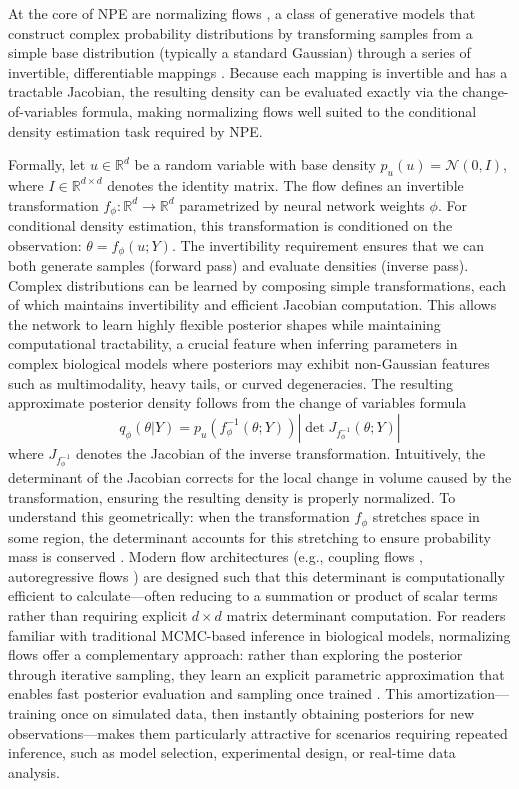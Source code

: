 \documentclass{article}
\begin{document}
At the core of NPE are normalizing flows \cite{rezende2015variational, papamakarios2021normalizing}, a class of generative models that construct complex probability distributions by transforming samples from a simple base distribution (typically a standard Gaussian) through a series of invertible, differentiable mappings \cite{kobyzev2020normalizing}. Because each mapping is invertible and has a tractable Jacobian, the resulting density can be evaluated exactly via the change-of-variables formula, making normalizing flows well suited to the conditional density estimation task required by NPE.


Formally, let $u \in \mathbb{R}^d$ be a random variable with base density $p_u(u) = \mathcal{N}(0, I)$, where $I \in \mathbb{R}^{d \times d}$ denotes the identity matrix. The flow defines an invertible transformation $f_\phi: \mathbb{R}^d \rightarrow \mathbb{R}^d$ parametrized by neural network weights $\phi$. For conditional density estimation, this transformation is conditioned on the observation: $\theta = f_\phi(u; Y)$. The invertibility requirement ensures that we can both generate samples (forward pass) and evaluate densities (inverse pass). Complex distributions can be learned by composing simple transformations, each of which maintains invertibility and efficient Jacobian computation. This allows the network to learn highly flexible posterior shapes while maintaining computational tractability, a crucial feature when inferring parameters in complex biological models where posteriors may exhibit non-Gaussian features such as multimodality, heavy tails, or curved degeneracies. The resulting approximate posterior density follows from the change of variables formula
\begin{equation}
	q_\phi(\theta | Y) = p_u(f_\phi^{-1}(\theta;Y)) \left| \det J_{f_\phi^{-1}}(\theta; Y) \right|
\end{equation}
where $J_{f_\phi^{-1}}$ denotes the Jacobian of the inverse transformation. Intuitively, the determinant of the Jacobian corrects for the local change in volume caused by the transformation, ensuring the resulting density is properly normalized. To understand this geometrically: when the transformation $f_{\phi}$
stretches space in some region, the determinant accounts for this stretching to ensure probability mass is conserved \cite{papamakarios2021normalizing}. Modern flow architectures (e.g., coupling flows \cite{dinh2016density}, autoregressive flows \cite{papamakarios2017masked}) are designed such that this determinant is computationally efficient to calculate---often reducing to a summation or product of scalar terms rather than requiring explicit $d \times d$ matrix determinant computation. For readers familiar with traditional MCMC-based inference in biological models, normalizing flows offer a complementary approach: rather than exploring the posterior through iterative sampling, they learn an explicit parametric approximation that enables fast posterior evaluation and sampling once trained \cite{Cranmer2020FrontierSBI}. This amortization---training once on simulated data, then instantly obtaining posteriors for new observations---makes them particularly attractive for scenarios requiring repeated inference, such as model selection, experimental design, or real-time data analysis.
\end{document}
